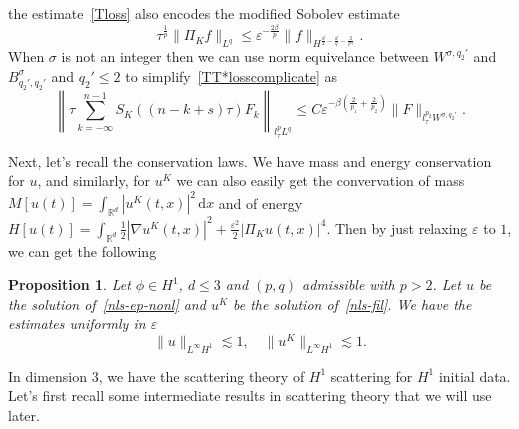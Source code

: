 \documentclass[10pt,a4paper]{article}
\newtheorem{proposition}[theorem]{Proposition}
\begin{document}
  the estimate~\eqref{Tloss} also encodes the modified Sobolev estimate
  \begin{equation}
    \label{sobmod}
    \tau^\frac1p \|\Pi_K f\|_{L^q} \leq \varepsilon^{-\frac{2\beta}p} 
    \|f \|_{H^{\frac{d}2-\frac{d}q-\frac2{p\gamma}}}.
  \end{equation}
  When \(\sigma\) is 
  not an integer then we can use norm equivelance between \(W^{\sigma,q_2'}\) and 
  \(B^\sigma_{q_2',q_2'}\) and \(q_2' \leq 2\) to
  simplify~\eqref{TT*losscomplicate} as 
  \begin{equation}\label{TT*loss}
    \left\| \tau \sum_{k=-\infty}^{n-1} S_K ((n-k+s)\tau) F_k \right\|_{l^p_\tau L^q} 
    \leq C \varepsilon^{-\beta(\frac2{p_1}+\frac2{p_2})} \|F\|_{l^{p_2}_\tau 
    W^{\sigma,q_2'}}.
  \end{equation}

  
  Next, let's recall the conservation laws. We have mass and energy conservation
  for \(u\), and similarly, for \(u^K\) we can also easily get the convervation
  of mass \(M[u(t)] = \int_{\mathbb R^d} |u^K(t,x)|^2 \,\mathrm{d}x\) and of energy
  \(H[u(t)] = \int_{\mathbb R^d} \frac12|\nabla u^K(t,x)|^2 + \frac{\varepsilon^2}2 |\Pi_K u(t,x)|^4\). 
  Then by just relaxing \(\varepsilon\) to \(1\), we can get the following
  \begin{proposition}
    Let \(\phi \in H^1\), \( d \leq 3 \) and \( (p,q) \) admissible with
    \( p > 2 \). Let \( u \) be the solution of~\eqref{nls-ep-nonl} and \(u^K\)
    be the solution of~\eqref{nls-fil}. We have the estimates uniformly in
    \(\varepsilon\)
    \begin{equation}\label{LinftyH1}
      \|u\|_{L^\infty H^1} \lesssim 1 ,\quad
      \|u^K\|_{L^\infty H^1} \lesssim 1.
    \end{equation}
  \end{proposition}

  In dimension \(3\), we have the scattering theory of \(H^1\) scattering for
  \(H^1\) initial data. Let's first recall some intermediate results in
  scattering theory that we will use later. 
  
\end{document}
